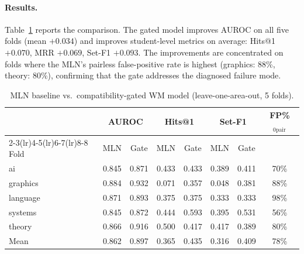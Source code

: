 \documentclass[11pt,openany]{report}
\begin{document}
\paragraph{Results.}
Table~\ref{tab:gate-results} reports the comparison.  The gated model
improves AUROC on all five folds (mean $+0.034$) and improves
student-level metrics on average: Hits@1 $+0.070$, MRR $+0.069$,
Set-F1 $+0.093$.  The improvements are concentrated on folds where
the MLN's pairless false-positive rate is highest (graphics: 88\%,
theory: 80\%), confirming that the gate addresses the diagnosed failure
mode.

\begin{table}[htbp]
\centering
\caption{MLN baseline vs.\ compatibility-gated WM model
  (leave-one-area-out, 5 folds).}
\label{tab:gate-results}
\small
\begin{tabular}{l cc cc cc c}
\toprule
& \multicolumn{2}{c}{AUROC} & \multicolumn{2}{c}{Hits@1}
& \multicolumn{2}{c}{Set-F1} & FP\%$_{\text{0pair}}$ \\
\cmidrule(lr){2-3}\cmidrule(lr){4-5}\cmidrule(lr){6-7}\cmidrule(lr){8-8}
Fold & MLN & Gate & MLN & Gate & MLN & Gate & \\
\midrule
ai       & 0.845 & 0.871 & 0.433 & 0.433 & 0.389 & 0.411 & 70\% \\
graphics & 0.884 & 0.932 & 0.071 & 0.357 & 0.048 & 0.381 & 88\% \\
language & 0.871 & 0.893 & 0.375 & 0.375 & 0.333 & 0.333 & 98\% \\
systems  & 0.845 & 0.872 & 0.444 & 0.593 & 0.395 & 0.531 & 56\% \\
theory   & 0.866 & 0.916 & 0.500 & 0.417 & 0.417 & 0.389 & 80\% \\
\midrule
Mean     & 0.862 & 0.897 & 0.365 & 0.435 & 0.316 & 0.409 & 78\% \\
\bottomrule
\end{tabular}
\end{table}
\end{document}

